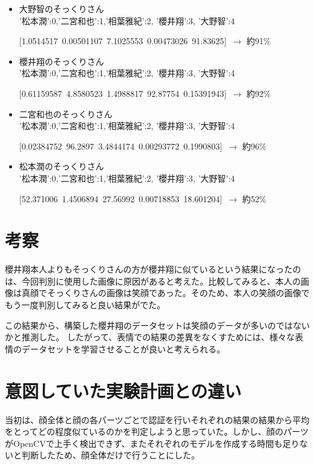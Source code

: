 \documentclass[a4paper, 11pt, titlepage]{jsarticle}
\begin{document}
\begin{enumerate}
\begin{itemize}
[0.06747932\ 0.40798137\ 99.31076\ 0.0790217\ 0.13476102]\ $\rightarrow$ 約99\%
\item{大野智のそっくりさん}\\
'松本潤':0,'二宮和也':1,'相葉雅紀':2, '櫻井翔':3, '大野智':4

[1.0514517\ 0.00501107\ 7.1025553\ 0.00473026\ 91.83625]\ $\rightarrow$ 約91\%
\item{櫻井翔のそっくりさん}\\
'松本潤':0,'二宮和也':1,'相葉雅紀':2, '櫻井翔':3, '大野智':4

[0.61159587\ 4.8580523\ 1.4988817\ 92.87754\ 0.15391943]\ $\rightarrow$ 約92\%
\item{二宮和也のそっくりさん}\\
'松本潤':0,'二宮和也':1,'相葉雅紀':2, '櫻井翔':3, '大野智':4

[0.02384752\ 96.2897\ 3.4844174\ 0.00293772\ 0.1990803]\ $\rightarrow$ 約96\%
\item{松本潤のそっくりさん}\\
'松本潤':0,'二宮和也':1,'相葉雅紀':2, '櫻井翔':3, '大野智':4

[52.371006\ 1.4506894\ 27.56992\ 0.00718853\ 18.601204]\ $\rightarrow$ 約52\%
\end{itemize}
\end{enumerate}

\section{考察}
櫻井翔本人よりもそっくりさんの方が櫻井翔に似ているという結果になったのは、今回判別に使用した画像に原因があると考えた。比較してみると、本人の画像は真顔でそっくりさんの画像は笑顔であった。そのため、本人の笑顔の画像でもう一度判別してみると良い結果がでた。

この結果から、構築した櫻井翔のデータセットは笑顔のデータが多いのではないかと推測した。 したがって、表情での結果の差異をなくすためには、様々な表情のデータセットを学習させることが良いと考えられる。

\section{意図していた実験計画との違い}
当初は、顔全体と顔の各パーツごとで認証を行いそれぞれの結果の結果から平均をとってどの程度似ているのかを判定しようと思っていた。しかし、顔のパーツがOpenCVで上手く検出できず、またそれぞれのモデルを作成する時間も足りないと判断したため、顔全体だけで行うことにした。
\end{document}
